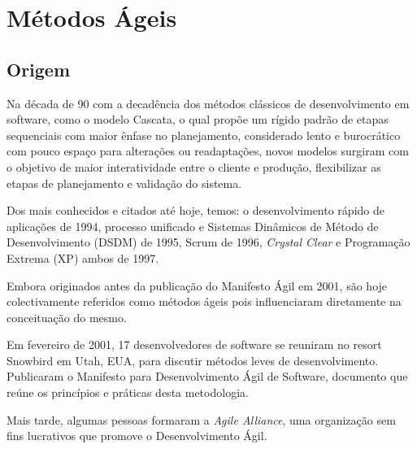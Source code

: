 \chapter{Métodos Ágeis}
\label{cap:metodosageis}
\section{Origem}
\par  Na década de 90 com a decadência dos métodos clássicos de desenvolvimento em software, como o modelo Cascata, o qual propõe um rígido padrão de etapas sequenciais com maior ênfase no planejamento, considerado lento e burocrático com pouco espaço para alterações ou readaptações, novos modelos surgiram com o objetivo de maior interatividade entre o cliente e produção, flexibilizar as etapas de planejamento e validação do sistema. 
\par Dos mais conhecidos e citados até hoje, temos: o desenvolvimento rápido de aplicações de 1994, processo unificado e Sistemas Dinâmicos de Método de Desenvolvimento (DSDM) de 1995, Scrum de 1996, \emph{Crystal Clear} e Programação Extrema (XP) ambos de 1997. 
\par Embora originados antes da publicação do Manifesto Ágil em 2001, são hoje colectivamente referidos como métodos ágeis pois influenciaram diretamente na conceituação do mesmo.
\par Em fevereiro de 2001, 17 desenvolvedores de software se reuniram no resort Snowbird em Utah, EUA, para discutir métodos leves de desenvolvimento. Publicaram o Manifesto para Desenvolvimento Ágil de Software, documento que reúne os princípios e práticas desta metodologia. 
\par Mais tarde, algumas pessoas formaram a \emph{Agile Alliance}, uma organização sem fins lucrativos que promove o Desenvolvimento Ágil.

